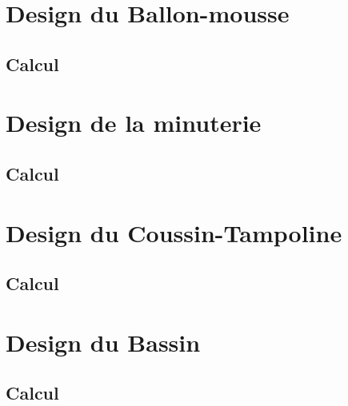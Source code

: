 \documentclass[12pt]{article}
\begin{document}
\section{Design du Ballon-mousse}
\subsection{Calcul}

\section{Design de la minuterie}
\subsection{Calcul}

\section{Design du Coussin-Tampoline}
\subsection{Calcul}

\section{Design du Bassin}
\subsection{Calcul}
\end{document}
